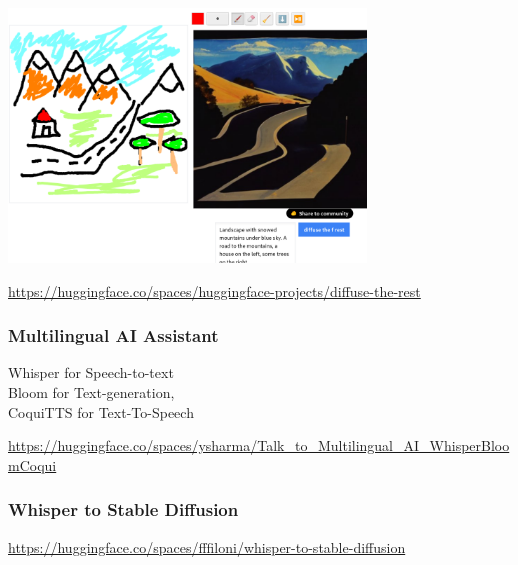 \documentclass[17pt,aspectratio=169,hyperref={pdfusetitle,colorlinks,allcolors=olive}]{beamer}
\begin{document}
\begin{frame}[fragile]

  \begin{center}
    \includegraphics[width=9.5cm]{figs/sd-mountains}
  \end{center}

  \begin{flushright}
    {\scriptsize
    \url{https://huggingface.co/spaces/huggingface-projects/diffuse-the-rest} \\
    }
  \end{flushright}
    
\end{frame}


\begin{frame}[fragile]
  \frametitle{Multilingual AI Assistant}

   Whisper for Speech-to-text  \\
   Bloom for Text-generation, \\
   CoquiTTS for Text-To-Speech \\
  
  \begin{flushright}
    {\scriptsize
      \url{https://huggingface.co/spaces/ysharma/Talk_to_Multilingual_AI_WhisperBloomCoqui} \\
    }
  \end{flushright}

\end{frame}

\begin{frame}[fragile]
  \frametitle{Whisper to Stable Diffusion}

  
  \begin{flushright}
    {\scriptsize
      \url{https://huggingface.co/spaces/fffiloni/whisper-to-stable-diffusion} \\
    }
  \end{flushright}

\end{frame}
\end{document}
